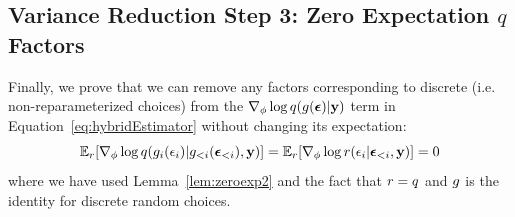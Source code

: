 \subsection{Variance Reduction Step 3: Zero Expectation $q$ Factors}

Finally, we prove that we can remove any factors corresponding to discrete (i.e. non-reparameterized choices) from the $\nabla_\phi \log q(g(\bm{\epsilon}) | \mathbf{y})$ term in Equation~\ref{eq:hybridEstimator} without changing its expectation:
\begin{equation*}
\expect_\reparamDist [ \gradparams \log \guide(\reparamXform_i(\reparamVar_i) | \reparamXform_{<i}(\reparamVars_{<i}), \observedVars) ]
%
= \expect_\reparamDist [ \gradparams \log \reparamDist(\reparamVar_i | \reparamVars_{<i}, \observedVars) ]
%
= 0
\end{equation*}
where we have used Lemma~\ref{lem:zeroexp2} and the fact that $r = q$ and $g$ is the identity for discrete random choices.
